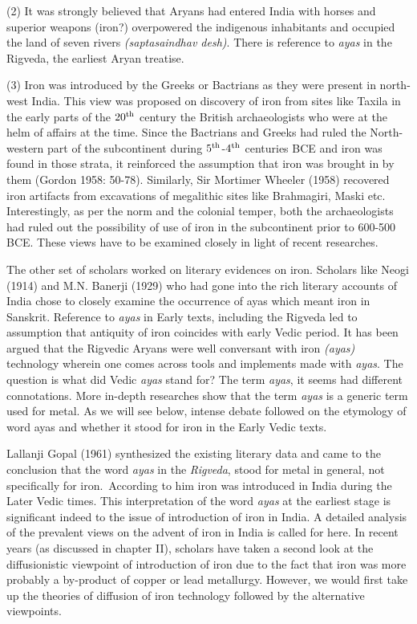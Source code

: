  (2) It was strongly believed that Aryans had entered India with horses and superior weapons (iron?) overpowered the indigenous inhabitants and occupied the land of seven rivers \textit{(saptasaindhav desh)}. There is reference to \textit{ayas} in the Rigveda, the earliest Aryan treatise. 
 
 (3) Iron was introduced by the Greeks or Bactrians as they were present in north-west India. This view was proposed on discovery of iron from sites like Taxila in the early parts of the $20^{\rm th}$ century the British archaeologists who were at the helm of affairs at the time. Since the Bactrians and Greeks had ruled the North-western part of the subcontinent during $5^{\rm th}$-$4^{\rm th}$ centuries BCE and iron was found in those strata, it reinforced the assumption that iron was brought in by them (Gordon 1958: 50-78). Similarly, Sir Mortimer Wheeler (1958) recovered iron artifacts from excavations of megalithic sites like Brahmagiri, Maski etc. Interestingly, as per the norm and the colonial temper, both the archaeologists had ruled out the possibility of use of iron in the subcontinent prior to 600-500 BCE. These views have to be examined closely in light of recent researches. 
 
The other set of scholars worked on literary evidences on iron. Scholars like Neogi (1914) and M.N. Banerji (1929) who had gone into the rich literary accounts of India chose to closely examine the occurrence of ayas which meant iron in Sanskrit. Reference to \textit{ayas} in Early texts, including the Rigveda led to assumption that antiquity of iron coincides with early Vedic period. It has been argued that the Rigvedic Aryans were well conversant with iron \textit{(ayas)} technology wherein one comes across tools and implements made with \textit{ayas}. The question is what did Vedic \textit{ayas} stand for? The term \textit{ayas}, it seems had different connotations. More in-depth researches show that the term \textit{ayas} is a generic term used for metal. As we will see below, intense debate followed on the etymology of word ayas and whether it stood for iron in the Early Vedic texts.


Lallanji Gopal (1961) synthesized the existing literary data and came to the conclusion that the word \textit{ayas} in the \textit{Rigveda}, stood for metal in general, not specifically for iron.~According to him iron was introduced in India during the Later Vedic times. This interpretation of the word \textit{ayas} at the earliest stage is significant indeed to the issue of introduction of iron in India. A detailed analysis of the prevalent views on the advent of iron in India is called for here. In recent years (as discussed in chapter II), scholars have taken a second look at the diffusionistic viewpoint of introduction of iron due to the fact that iron was more probably a by-product of copper or lead metallurgy. However, we would first take up the theories of diffusion of iron technology followed by the alternative viewpoints. 

